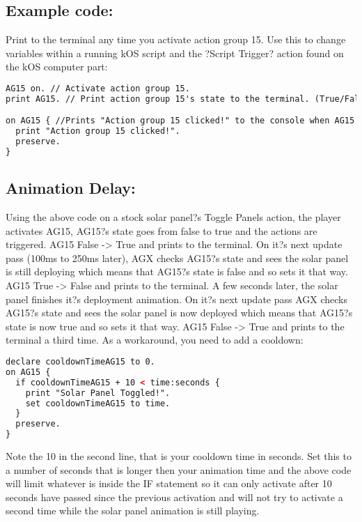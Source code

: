 \subsection{Example code:}

Print to the terminal any time you activate action group 15. Use this to change variables within a running kOS script and the ?Script Trigger? action found on the kOS computer part:

\begin{lstlisting}[frame=single,language=XML]
AG15 on. // Activate action group 15.
print AG15. // Print action group 15's state to the terminal. (True/False)

on AG15 { //Prints "Action group 15 clicked!" to the console when AG15 is toggled, either via "AG15 on." or in-game with an assigned key.
  print "Action group 15 clicked!".
  preserve.
}
\end{lstlisting}

\subsection{Animation Delay:}

Using the above code on a stock solar panel?s Toggle Panels action, the player activates AG15, AG15?s state goes from false to true and the actions are triggered. AG15 False -> True and prints to the terminal.
On it?s next update pass (100ms to 250ms later), AGX checks AG15?s state and sees the solar panel is still deploying which means that AG15?s state is false and so sets it that way. AG15 True -> False and prints to the terminal.
A few seconds later, the solar panel finishes it?s deployment animation. On it?s next update pass AGX checks AG15?s state and sees the solar panel is now deployed which means that AG15?s state is now true and so sets it that way. AG15 False -> True and prints to the terminal a third time.
As a workaround, you need to add a cooldown:

\begin{lstlisting}[frame=single,language=XML]
declare cooldownTimeAG15 to 0.
on AG15 {
  if cooldownTimeAG15 + 10 < time:seconds {
    print "Solar Panel Toggled!".
    set cooldownTimeAG15 to time.
  }
  preserve.
}
\end{lstlisting}

Note the 10 in the second line, that is your cooldown time in seconds. Set this to a number of seconds that is longer then your animation time and the above code will limit whatever is inside the IF statement so it can only activate after 10 seconds have passed since the previous activation and will not try to activate a second time while the solar panel animation is still playing.
